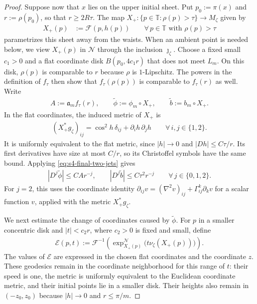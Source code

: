 \documentclass[a4paper,11pt,oneside,reqno]{amsart}
\numberwithin{equation}{section}
\theoremstyle{definition}
\begin{document}
\begin{proof}
    Suppose now that $x$ lies on the upper initial sheet.
    Put $p_0:=\pi(x)$ and $r:=\rho(p_0)$, so that
    $r\geq2R\tau$. The map  $X_+:\{p\in\mathbb T:\rho(p)>\tau\}\rightarrow M_\zeta$ given by
    \begin{align*}
        X_+(p)&:=\mathcal F(p,h(p)) \qquad\forall\,p\in\mathbb T\text{ with }\rho(p)>\tau
    \end{align*}
    parametrizes this sheet away from the waists.
    When an ambient point is needed below, we view
    $X_+(p)$ in $\mathcal N$ through the inclusion
    $\jmath_\zeta$.
    Choose a fixed small $c_1>0$ and a flat coordinate disk
    $B(p_0,4c_1r)$ that does not meet $L_m$.
    On this disk, $\rho(p)$ is comparable to $r$ because
    $\rho$ is $1$-Lipschitz. The powers in the definition
    of $f_\tau$ then show that $f_\tau(\rho(p))$ is
    comparable to $f_\tau(r)$ as well.
    Write
    \begin{align*}
        A:=\mathfrak a_m f_\tau(r),\qquad
        \widetilde\phi:=\phi_m\circ X_+,\qquad
        \widetilde b:=b_m\circ X_+.
    \end{align*}
    In the flat coordinates, the induced metric of $X_+$ is
    \begin{align*}
        (X_+^*g_\zeta)_{ij}
        =\cos^2h\,\delta_{ij}+\partial_i h\,\partial_j h
        \qquad\forall\,i,j\in\{1,2\}.
    \end{align*}
    It is uniformly equivalent to the flat metric, since
    $|h|\to0$ and $|Dh|\leq C\tau/r$.
    Its first derivatives have size at most $C/r$, so its
    Christoffel symbols have the same bound.
    Applying \eqref{eq:s4-final-two-jets} gives
    \begin{align*}
        |D^j\widetilde\phi|\leq CAr^{-j},\qquad
        |D^j\widetilde b|\leq C\tau^2r^{-j}
        \qquad\forall\,j\in\{0,1,2\}.
    \end{align*}
    For $j=2$, this uses the coordinate identity
    $\partial_{ij}v=(\nabla^2v)_{ij}
       +\Gamma_{ij}^k\partial_kv$ for a scalar function
    $v$, applied with the metric $X_+^*g_\zeta$.

    We next estimate the change of coordinates caused by
    $\widetilde\phi$. For $p$ in a smaller concentric disk
    and $|t|<c_2r$, where $c_2>0$ is fixed and small, define
    \begin{align*}
        \mathcal E(p,t):=
        \mathcal F^{-1}\!\left(
        \exp_{X_+(p)}^{\mathcal N}
             \bigl(t\nu_\zeta(X_+(p))\bigr)\right).
    \end{align*}
    The values of $\mathcal E$ are expressed in the chosen
    flat coordinates and the coordinate $z$.
    These geodesics remain in the coordinate neighborhood
    for this range of $t$: their speed is one, the metric
    is uniformly equivalent to the Euclidean coordinate
    metric, and their initial points lie in a smaller disk.
    Their heights also remain in $(-z_0,z_0)$ because
    $|h|\to0$ and $r\leq\pi/m$.


\end{proof}
\end{document}
